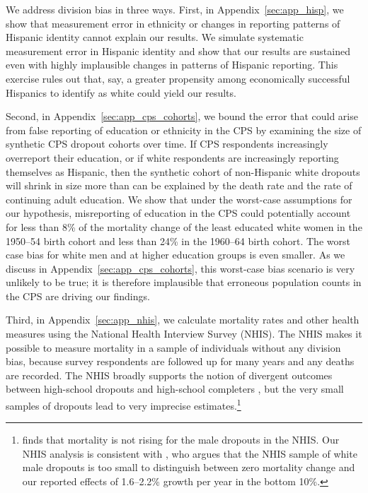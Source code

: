 \documentclass[12pt,letterpaper]{article}
\numberwithin{equation}{section}
\begin{document}
We address division bias in three ways. First, in Appendix~\ref{sec:app_hisp}, we show that measurement error in ethnicity or changes in reporting patterns of Hispanic identity cannot explain our results. We simulate systematic measurement error in Hispanic identity and show that our results are sustained even with highly implausible changes in patterns of Hispanic reporting. This exercise rules out that, say, a greater propensity among economically successful Hispanics to identify as white could yield our results.

Second, in Appendix~\ref{sec:app_cps_cohorts}, we bound the error that could arise from false reporting of education or ethnicity in the CPS by examining the size of synthetic CPS dropout cohorts over time. If CPS respondents increasingly overreport their education, or if white respondents are increasingly reporting themselves as Hispanic, then the synthetic cohort of non-Hispanic white dropouts will shrink in size more than can be explained by the death rate and the rate of continuing adult education. We show that under the worst-case assumptions for our hypothesis, misreporting of education in the CPS could potentially account for less than 8\% of the mortality change of the least educated white women in the 1950--54 birth cohort and less than 24\% in the 1960--64 birth cohort. The worst case bias for white men and at higher education groups is even smaller. As we discuss in Appendix~\ref{sec:app_cps_cohorts}, this worst-case bias scenario is very unlikely to be true; it is therefore implausible that erroneous population counts in the CPS are driving our findings.

Third, in Appendix~\ref{sec:app_nhis}, we calculate mortality rates and other health measures using the National Health Interview Survey (NHIS). The NHIS makes it possible to measure mortality in a sample of individuals without any division bias, because survey respondents are followed up for many years and any deaths are recorded. The NHIS broadly supports the notion of divergent outcomes between high-school dropouts and high-school completers \citep{Hendi2015,Sasson2016,Hendi2017,Sasson2017}, but the very small samples of dropouts lead to very imprecise estimates.\footnote{\citet{Hendi2015} finds that mortality is not rising for the male dropouts in the NHIS. Our NHIS analysis is consistent with \citet{Sasson2017}, who argues that the NHIS sample of white male dropouts is too small to distinguish between zero mortality change and our reported effects of 1.6--2.2\% growth per year in the bottom 10\%.}
\end{document}
